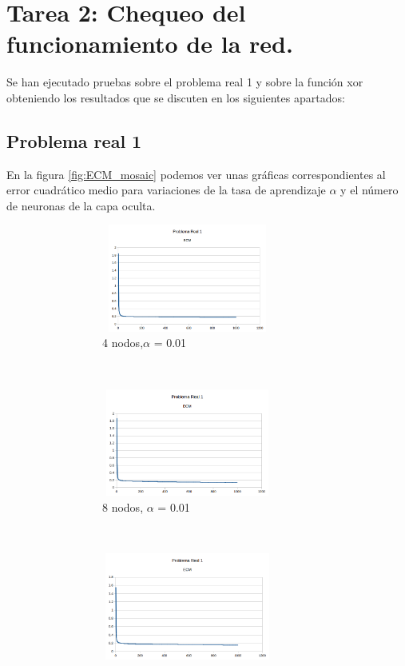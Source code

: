 \documentclass[spanish]{assignment}
\begin{document}
	\section{Tarea 2: Chequeo del funcionamiento de la red.}
	Se han ejecutado pruebas sobre el problema real 1 y sobre la función xor obteniendo los resultados que se discuten en los siguientes apartados:
	
	\subsection{Problema real 1}
	En la figura \ref{fig:ECM_mosaic} podemos ver unas gráficas correspondientes al error cuadrático medio para variaciones de la tasa de aprendizaje $\alpha$ y el número de neuronas de la capa oculta.
	
	\begin{figure}[ht!]
		\begin{subfigure}[t!]{0.5\textwidth}
			\begin{subfigure}[t!]{\textwidth}
				\centering
				\includegraphics[width=160pt, height=100pt]{PR1h1.png}
				\caption{4 nodos,$\alpha$ = 0.01}
			\end{subfigure}\\
			\begin{subfigure}[t!]{\textwidth}
				\centering
				\includegraphics[width=160pt, height=100pt]{PR1h2.png}
				\caption{8 nodos, $\alpha$ = 0.01}
			\end{subfigure}\\
			\begin{subfigure}[t!]{\textwidth}
				\centering
				\includegraphics[width=160pt, height=100pt]{PR1h3.png}

\end{subfigure}
\end{subfigure}
\end{figure}
\end{document}
